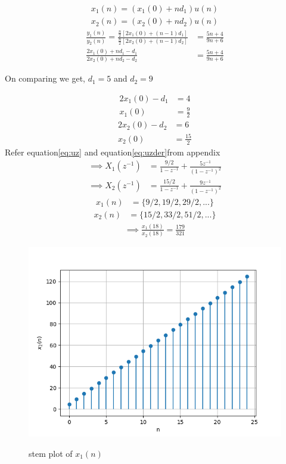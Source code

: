 \documentclass[journal,12pt,onecolumn]{IEEEtran}
\theoremstyle{remark}
\begin{document}
\begin{align}
x_1(n)=(x_1(0)+nd_1)u(n)
\label{eq:1}
\end{align}
\begin{align}
x_2(n)=(x_2(0)+nd_2)u(n)
\label{eq:2}
\end{align}
\begin{align}
\frac{y_1(n)}{y_2(n)}=\frac{\frac{n}{2}\left[ 2x_1(0) +(n-1)d_1 \right]}{\frac{n}{2}\left[ 2x_2(0) +(n-1)d_2 \right]}&= \frac{5n+4}{9n+6}\\
\frac{2x_1(0) +nd_1-d_1}{2x_2(0) +nd_2-d_2 }&= \frac{5n+4}{9n+6}
\end{align}
\begin{center}
On comparing we get, $ d_1 = 5 $ and $ d_2 = 9$ \\
\end{center}
\begin{align}
2x_1(0) - d_1 &= 4\\
x_1(0) &=\frac{9}{2}
\end{align}
\begin{align}
2x_2(0)- d_2&=6\\
x_2(0) &=\frac{15}{2}
\end{align}
Refer equation\eqref{eq:uz}  and equation\eqref{eq:uzder}from appendix
\begin{align}
   \implies X_1(z^{-1}) &=\frac{9/2}{1-z^{-1}} + \frac{ 5z^{-1}}{(1-z^{-1})^2}\\
    \implies X_2(z^{-1})&= \frac{15/2}{1-z^{-1}} + \frac{9z^{-1}}{(1-z^{-1})^2}
\end{align}
\begin{align}
x_1(n)&= \lbrace 9/2,19/2,29/2,...\rbrace 
\end{align}
\begin{align}
x_2(n)&= \lbrace 15/2,33/2,51/2,...\rbrace 
\end{align}
\begin{align}
\implies \frac{x_1(18)}{x_2(18)}=\frac{179}{321}
\end{align}
\begin{figure}[h!]
	\centering
	\includegraphics[width=\columnwidth]{figs/fig1.png}
	\label{fig:plot}
	\caption{\large{stem plot of $x_1(n)$}}
\end{figure}
\end{document}
